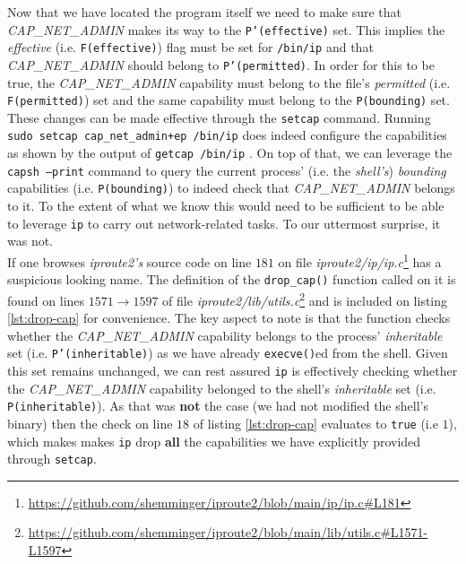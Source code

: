         Now that we have located the program itself we need to make sure that \textit{CAP\_NET\_ADMIN} makes its way to the \texttt{P'(effective)} set. This implies the \textit{effective} (i.e. \texttt{F(effective)}) flag must be set for \texttt{/bin/ip} and that \textit{CAP\_NET\_ADMIN} should belong to \texttt{P'(permitted)}. In order for this to be true, the \textit{CAP\_NET\_ADMIN} capability must belong to the file's \textit{permitted} (i.e. \texttt{F(permitted)}) set and the same capability must belong to the \texttt{P(bounding)} set.\\

        These changes can be made effective through the \texttt{setcap} \cite{bib:man-setcap} command. Running \texttt{sudo setcap cap\_net\_admin+ep /bin/ip} does indeed configure the capabilities as shown by the output of \texttt{getcap /bin/ip} \cite{bib:man-getcap}. On top of that, we can leverage the \texttt{capsh --print} \cite{bib:man-capsh} command to query the current process' (i.e. the \textit{shell's}) \textit{bounding} capabilities (i.e. \texttt{P(bounding)}) to indeed check that \textit{CAP\_NET\_ADMIN} belongs to it. To the extent of what we know this would need to be sufficient to be able to leverage \texttt{ip} to carry out network-related tasks. To our uttermost surprise, it was not.\\

        If one browses \textit{iproute2's} source code on \cite{bib:iproute2-src} line $181$ on file \textit{iproute2/ip/ip.c}\footnote{\url{https://github.com/shemminger/iproute2/blob/main/ip/ip.c\#L181}} has a suspicious looking name. The definition of the \texttt{drop\_cap()} function called on it is found on lines $1571 \to 1597$ of file \textit{iproute2/lib/utils.c}\footnote{\url{https://github.com/shemminger/iproute2/blob/main/lib/utils.c\#L1571-L1597}} and is included on listing \ref{lst:drop-cap} for convenience. The key aspect to note is that the function checks whether the \textit{CAP\_NET\_ADMIN} capability belongs to the process' \textit{inheritable} set (i.e. \texttt{P'(inheritable)}) as we have already \texttt{execve()}ed from the shell. Given this set remains unchanged, we can rest assured \texttt{ip} is effectively checking whether the \textit{CAP\_NET\_ADMIN} capability belonged to the shell's \textit{inheritable} set (i.e. \texttt{P(inheritable)}). As that was \textbf{not} the case (we had not modified the shell's binary) then the check on line $18$ of listing \ref{lst:drop-cap} evaluates to \texttt{true} (i.e $1$), which makes makes \texttt{ip} drop \textbf{all} the capabilities we have explicitly provided through \texttt{setcap}.\\

